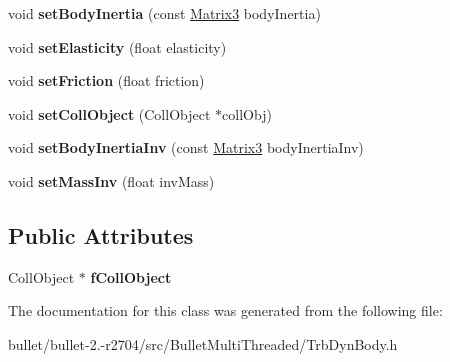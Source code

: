 \begin{DoxyCompactItemize}
\item 
\hypertarget{class_trb_dyn_body_aa73a3217880970d4104f0a63dcfd1ad8}{void {\bfseries set\+Body\+Inertia} (const \hyperlink{class_vectormath_1_1_aos_1_1_matrix3}{Matrix3} body\+Inertia)}\label{class_trb_dyn_body_aa73a3217880970d4104f0a63dcfd1ad8}

\item 
\hypertarget{class_trb_dyn_body_af48bbda40cb47f0b68dc5cb73b2e0b69}{void {\bfseries set\+Elasticity} (float elasticity)}\label{class_trb_dyn_body_af48bbda40cb47f0b68dc5cb73b2e0b69}

\item 
\hypertarget{class_trb_dyn_body_a3c27f2e9ae31167a57076e4c29bb0639}{void {\bfseries set\+Friction} (float friction)}\label{class_trb_dyn_body_a3c27f2e9ae31167a57076e4c29bb0639}

\item 
\hypertarget{class_trb_dyn_body_aac23aacc5358a75a0c23a7d07e9b1ba8}{void {\bfseries set\+Coll\+Object} (Coll\+Object $\ast$coll\+Obj)}\label{class_trb_dyn_body_aac23aacc5358a75a0c23a7d07e9b1ba8}

\item 
\hypertarget{class_trb_dyn_body_a22693d017bd96fb2b88b6600a9942574}{void {\bfseries set\+Body\+Inertia\+Inv} (const \hyperlink{class_vectormath_1_1_aos_1_1_matrix3}{Matrix3} body\+Inertia\+Inv)}\label{class_trb_dyn_body_a22693d017bd96fb2b88b6600a9942574}

\item 
\hypertarget{class_trb_dyn_body_a0e37f5368721b8a76dd8590fdb40fb10}{void {\bfseries set\+Mass\+Inv} (float inv\+Mass)}\label{class_trb_dyn_body_a0e37f5368721b8a76dd8590fdb40fb10}

\end{DoxyCompactItemize}
\subsection*{Public Attributes}
\begin{DoxyCompactItemize}
\item 
\hypertarget{class_trb_dyn_body_a72f9e530f7c99f46992b1518b650aba8}{Coll\+Object $\ast$ {\bfseries f\+Coll\+Object}}\label{class_trb_dyn_body_a72f9e530f7c99f46992b1518b650aba8}

\end{DoxyCompactItemize}


The documentation for this class was generated from the following file\+:\begin{DoxyCompactItemize}
\item 
bullet/bullet-\/2.-\/r2704/src/\+Bullet\+Multi\+Threaded/Trb\+Dyn\+Body.\+h\end{DoxyCompactItemize}
